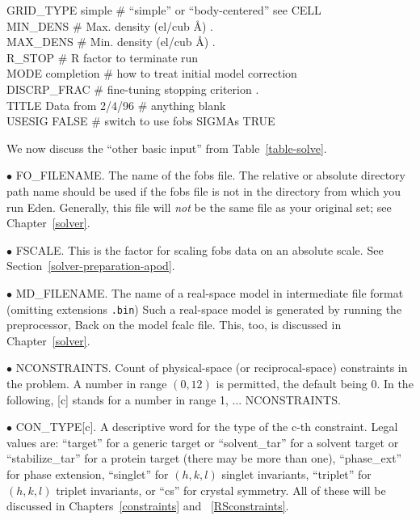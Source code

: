 \documentclass{report}
\begin{document}
\begin{table} [p]
\begin{tabbing}
GRID\_TYPE  \> simple \> \# ``simple'' or ``body-centered'' \> see CELL \\
MIN\_DENS  \> \# Max. density (el/cub \AA) . \\
MAX\_DENS  \> \# Min. density (el/cub \AA) . \\
R\_STOP    \> \# R factor to terminate run  \\
MODE \> completion \> \# how to treat initial model \> correction \\
DISCRP\_FRAC  \> \# fine-tuning stopping criterion  . \\
TITLE \> Data from 2/4/96 \> \# anything \> blank \\
USESIG \> FALSE \> \# switch to use fobs SIGMAs \> TRUE \\
\end{tabbing} 
\end{table}

\vspace {0.1in}

We now discuss the ``other basic input'' from Table~\ref{table-solve}.

\vspace {0.1in}
$\bullet$ FO\_FILENAME.  The name of the fobs file.
The relative or absolute directory path name should be used if the fobs file
is not in the directory from which you run Eden.  Generally, 
this file will {\em not} 
be the same file as your original set; see Chapter~\ref{solver}.

$\bullet$ FSCALE. This is the factor 
for scaling fobs data on an
absolute scale.  See Section~\ref{solver-preparation-apod}.

$\bullet$ MD\_FILENAME.
  The name of a real-space model in intermediate file 
format (omitting extensions {\tt .bin}) 
Such a real-space model is generated by running the preprocessor, 
Back on the model fcalc file.  This, too, is discussed in Chapter~\ref{solver}.

$\bullet$ NCONSTRAINTS.
  Count of physical-space (or reciprocal-space)
constraints in the problem.
A number in range $(0, 12)$ is permitted, the default being $0$.
In the following, [c] stands for a number in range 1, ... NCONSTRAINTS.

$\bullet$ CON\_TYPE[c].  
A descriptive word for the type of the c-th constraint.  Legal
values are: ``target'' for a generic target or ``solvent\_tar'' for a solvent 
target or ``stabilize\_tar'' for a protein target
(there may be more than one), 
``phase\_ext'' for phase extension,
``singlet'' for $(h,k,l)$ singlet invariants,
``triplet'' for $(h,k,l)$ triplet invariants,
or ``cs'' for crystal symmetry.
All of these will be discussed in Chapters~\ref{constraints} and 
~\ref{RSconstraints}.
\end{document}
